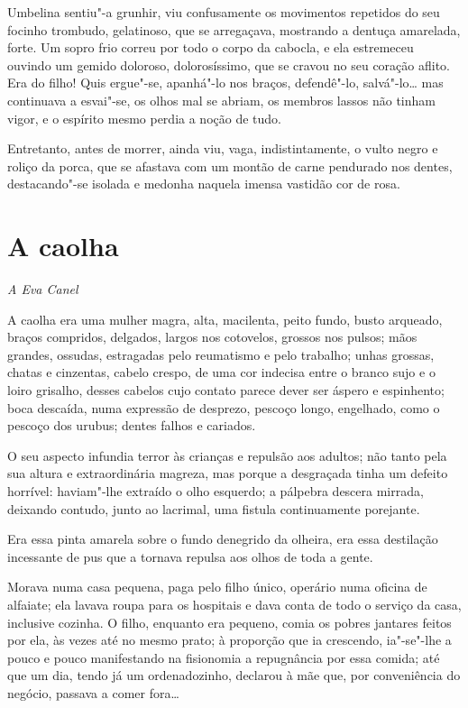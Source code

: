 Umbelina sentiu"-a grunhir, viu confusamente os movimentos repetidos do
seu focinho trombudo, gelatinoso, que se arregaçava, mostrando a dentuça
amarelada, forte. Um sopro frio correu por todo o corpo da cabocla, e
ela estremeceu ouvindo um gemido doloroso, dolorosíssimo, que se cravou
no seu coração aflito. Era do filho! Quis ergue"-se, apanhá"-lo nos
braços, defendê"-lo, salvá"-lo\ldots{} mas continuava a esvai"-se, os olhos mal
se abriam, os membros lassos não tinham vigor, e o espírito mesmo perdia
a noção de tudo.

Entretanto, antes de morrer, ainda viu, vaga, indistintamente, o vulto
negro e roliço da porca, que se afastava com um montão de carne
pendurado nos dentes, destacando"-se isolada e medonha naquela imensa
vastidão cor de rosa.

\chapter{A caolha}

\hfill{}\emph{A Eva Canel}

\bigskip

\noindent{}A caolha era uma mulher magra, alta, macilenta, peito fundo, busto
arqueado, braços compridos, delgados, largos nos cotovelos, grossos nos
pulsos; mãos grandes, ossudas, estragadas pelo reumatismo e pelo
trabalho; unhas grossas, chatas e cinzentas, cabelo crespo, de uma cor
indecisa entre o branco sujo e o loiro grisalho, desses cabelos cujo
contato parece dever ser áspero e espinhento; boca descaída, numa
expressão de desprezo, pescoço longo, engelhado, como o pescoço dos
urubus; dentes falhos e cariados.

O seu aspecto infundia terror às crianças e repulsão aos adultos; não
tanto pela sua altura e extraordinária magreza, mas porque a desgraçada
tinha um defeito horrível: haviam"-lhe extraído o olho esquerdo; a
pálpebra descera mirrada, deixando contudo, junto ao lacrimal, uma
fistula continuamente porejante.

Era essa pinta amarela sobre o fundo denegrido da olheira, era essa
destilação incessante de pus que a tornava repulsa aos olhos de toda a
gente.

Morava numa casa pequena, paga pelo filho único, operário numa oficina
de alfaiate; ela lavava roupa para os hospitais e dava conta de todo o
serviço da casa, inclusive cozinha. O filho, enquanto era pequeno, comia
os pobres jantares feitos por ela, às vezes até no mesmo prato; à
proporção que ia crescendo, ia"-se"-lhe a pouco e pouco manifestando na
fisionomia a repugnância por essa comida; até que um dia, tendo já um
ordenadozinho, declarou à mãe que, por conveniência do negócio, passava
a comer fora\ldots{}

